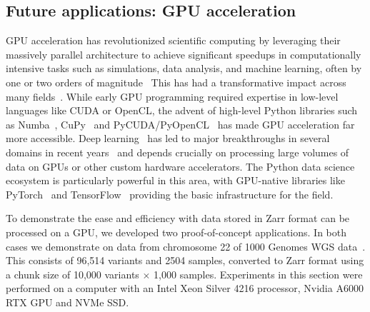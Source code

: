 \documentclass[a4paper,num-refs]{oup-contemporary}
\begin{document}
\subsection{Future applications: GPU acceleration}
GPU acceleration has revolutionized scientific computing by leveraging 
their massively parallel architecture to achieve significant speedups in
computationally intensive tasks such as simulations, data analysis, and machine
learning, often by one or two orders of magnitude~\citep{nickolls2010gpu,
mittal2014survey,owens2008gpu}
This has had a transformative impact across many 
fields~\citep[e.g.][]{stone2007accelerating,pandey2022transformational}.
While early GPU programming required expertise in
low-level languages like CUDA or OpenCL, the advent of high-level Python
libraries such as Numba~\citep{lam2015numba}, CuPy~\citep{okuta2017cupy} 
and PyCUDA/PyOpenCL~\citep{klockner2012pycuda}
has made GPU acceleration far more accessible.
Deep learning~\citep{lecun2015deep} has led to major breakthroughs in 
several domains in recent 
years~\citep[e.g.][]{jumper2021highly,merchant2023scaling}
and depends crucially on processing large volumes of data
on GPUs or other custom hardware accelerators.
The Python data science ecosystem is particularly powerful in this area,
with GPU-native libraries like
PyTorch~\cite{paszke2019pytorch}
and TensorFlow~\citep{tensorflow2015-whitepaper}
providing the basic infrastructure for the field.

To demonstrate the ease and efficiency with data stored in Zarr
format can be processed on a GPU, we developed two proof-of-concept
applications. 
In both cases we demonstrate on data from chromosome 22 of
1000 Genomes WGS data~\citep{byrska2022high}. This consists
of 96,514 variants and 2504 samples, converted to Zarr format
using a chunk size of 10,000 variants $\times$ 1,000 samples.
Experiments in this section were performed on a
computer with an Intel Xeon Silver 4216 processor,
Nvidia A6000 RTX GPU and NVMe SSD.
\end{document}
